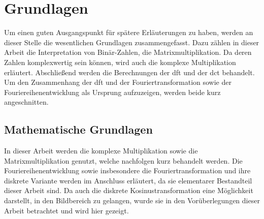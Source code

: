 



 
 
 
 \tableofcontents
 
 
 
 
 
 
 
 \chapter{Grundlagen}
 Um einen guten Ausgangspunkt für spätere Erläuterungen zu haben, werden an dieser Stelle die wesentlichen Grundlagen zusammengefasst.
 Dazu zählen in dieser Arbeit die Interpretation von Binär-Zahlen, die Matrixmultiplikation. Da deren Zahlen komplexwertig sein können,
 wird auch die komplexe Multiplikation erläutert. Abschließend werden die Berechnungen der 
 \gls{dft} und der 
 \gls{dct} behandelt. Um den Zusammenhang der \gls{dft} und der Fouriertransformation sowie der Fouriereihenentwicklung als Ursprung aufzuzeigen,
 werden beide kurz angeschnitten.
 
 
 \section{Mathematische Grundlagen}
 In dieser Arbeit werden die komplexe Multiplikation sowie die Matrixmultiplikation genutzt, welche nachfolgen kurz behandelt werden.
 Die Fouriereihenentwicklung sowie insbesondere die Fouriertransformation und ihre diskrete Variante werden im Anschluss erläutert, da
 sie elementarer Bestandteil dieser Arbeit sind.
 Da auch die diskrete Kosinustransformation eine Möglichkeit darstellt, in den Bildbereich zu gelangen, wurde sie in den 
 Vorüberlegungen dieser Arbeit betrachtet und wird hier gezeigt. 
 
 
 
 
  
 
 
  
 
